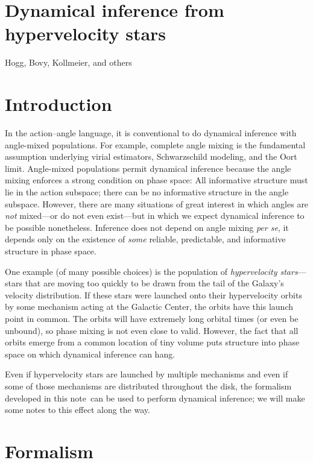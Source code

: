 \documentclass[12pt]{article}
\newcommand{\documentname}{note}
\newcommand{\latin}[1]{\emph{#1}}
\begin{document}
\section*{Dynamical inference from hypervelocity stars}

\noindent
Hogg, Bovy, Kollmeier, and others

\section{Introduction}

In the action--angle language, it is conventional to do dynamical
inference with angle-mixed populations.  For example, complete angle
mixing is the fundamental assumption underlying virial estimators,
Schwarzschild modeling, and the Oort limit.  Angle-mixed populations
permit dynamical inference because the angle mixing enforces a strong
condition on phase space: All informative structure must lie in the
action subspace; there can be no informative structure in the angle
subspace.  However, there are many situations of great interest in
which angles are \emph{not} mixed---or do not even exist---but in
which we expect dynamical inference to be possible nonetheless.
Inference does not depend on angle mixing \latin{per se}, it depends
only on the existence of \emph{some} reliable, predictable, and
informative structure in phase space.

One example (of many possible choices) is the population of
\emph{hypervelocity stars}---stars that are moving too quickly to be
drawn from the tail of the Galaxy's velocity distribution.  If these
stars were launched onto their hypervelocity orbits by some mechanism
acting at the Galactic Center, the orbits have this launch point in
common.  The orbits will have extremely long orbital times (or even be
unbound), so phase mixing is not even close to valid.  However, the
fact that all orbits emerge from a common location of tiny volume puts
structure into phase space on which dynamical inference can hang.

Even if hypervelocity stars are launched by multiple mechanisms and
even if some of those mechanisms are distributed throughout the disk,
the formalism developed in this \documentname\ can be used to perform
dynamical inference; we will make some notes to this effect along the
way.

\section{Formalism}
\end{document}
